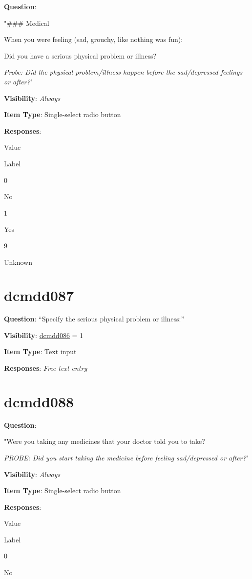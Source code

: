 \documentclass[
]{book}
\begin{document}
\textbf{Question}:

"\#\#\# Medical

When you were feeling (sad, grouchy, like nothing was fun):

Did you have a serious physical problem or illness?

\emph{Probe: Did the physical problem/illness happen before the sad/depressed feelings or after?}"

\textbf{Visibility}: \emph{Always}

\textbf{Item Type}: Single-select radio button

\textbf{Responses}:

Value

Label

0

No

1

Yes

9

Unknown

\hypertarget{dcmdd087}{%
\section{dcmdd087}\label{dcmdd087}}

\textbf{Question}: ``Specify the serious physical problem or illness:''

\textbf{Visibility}: \protect\hyperlink{dcmdd086}{dcmdd086} = 1

\textbf{Item Type}: Text input

\textbf{Responses}: \emph{Free text entry}

\hypertarget{dcmdd088}{%
\section{dcmdd088}\label{dcmdd088}}

\textbf{Question}:

"Were you taking any medicines that your doctor told you to take?

\emph{PROBE: Did you start taking the medicine before feeling sad/depressed or after?}"

\textbf{Visibility}: \emph{Always}

\textbf{Item Type}: Single-select radio button

\textbf{Responses}:

Value

Label

0

No
\end{document}
